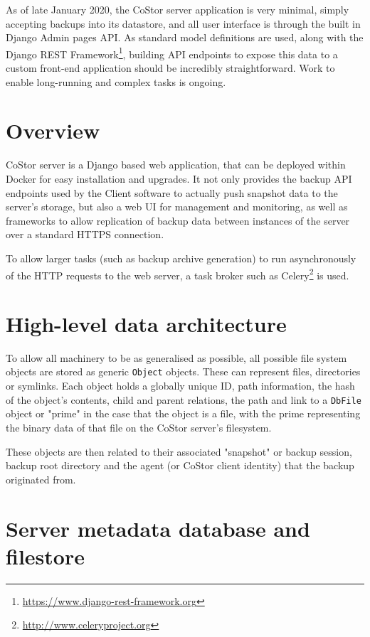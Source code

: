 \documentclass[bsc,frontabs,twoside,singlespacing,parskip,deptreport]{infthesis}     %
\begin{document}
As of late January 2020, the CoStor server application is very minimal, simply accepting backups 
into its datastore, and all user interface is through the built in Django Admin pages API. As
standard model definitions are used, along with the Django REST Framework\footnote{\url{https://www.django-rest-framework.org}},
building API endpoints to expose this data to a custom front-end application should be incredibly
straightforward. Work to enable long-running and complex tasks is ongoing.

\section{Overview}

CoStor server is a Django based web application, that can be deployed within Docker for easy
installation and upgrades. It not only provides the backup API endpoints used by the Client
software to actually push snapshot data to the server's storage, but also a web UI for 
management and monitoring, as well as frameworks to allow replication of backup data between
instances of the server over a standard HTTPS connection.

To allow larger tasks (such as backup archive generation) to run asynchronously of the HTTP
requests to the web server, a task broker such as Celery\footnote{\url{http://www.celeryproject.org}} 
is used.

\clearpage

\section{High-level data architecture}

To allow all machinery to be as generalised as possible, all possible file system objects are stored
as generic \texttt{Object} objects. These can represent files, directories or symlinks. Each object
holds a globally unique ID, path information, the hash of the object's contents, child and parent 
relations, the path and link to a \texttt{DbFile} object or "prime" in the case that the object is
a file, with the prime representing the binary data of that file on the CoStor server's filesystem.

These objects are then related to their associated "snapshot" or backup session, backup root directory
and the agent (or CoStor client identity) that the backup originated from.

\section{Server metadata database and filestore}
\end{document}
